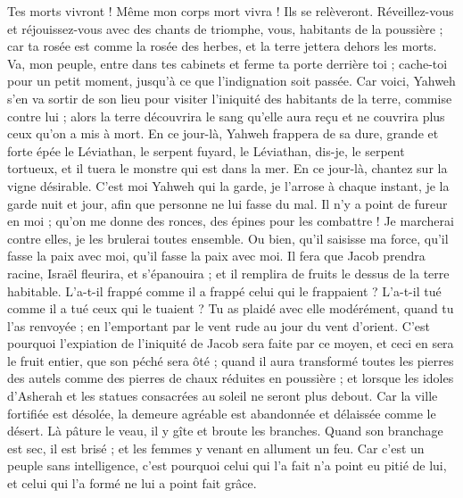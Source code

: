 \begin{multicols}{2}
Tes morts vivront ! Même mon corps mort vivra ! Ils se relèveront. Réveillez-vous et réjouissez-vous avec des chants de triomphe, vous, habitants de la poussière ; car ta rosée est comme la rosée des herbes, et la terre jettera dehors les morts.
Va, mon peuple, entre dans tes cabinets et ferme ta porte derrière toi ; cache-toi pour un petit moment, jusqu'à ce que l'indignation soit passée.
Car voici, Yahweh s'en va sortir de son lieu pour visiter l'iniquité des habitants de la terre, commise contre lui ; alors la terre découvrira le sang qu'elle aura reçu et ne couvrira plus ceux qu'on a mis à mort.
\VerseOne{}En ce jour-là, Yahweh frappera de sa dure, grande et forte épée le Léviathan, le serpent fuyard, le Léviathan, dis-je, le serpent tortueux, et il tuera le monstre qui est dans la mer.
En ce jour-là, chantez sur la vigne désirable.
C'est moi Yahweh qui la garde, je l'arrose à chaque instant, je la garde nuit et jour, afin que personne ne lui fasse du mal.
Il n'y a point de fureur en moi ; qu'on me donne des ronces, des épines pour les combattre ! Je marcherai contre elles, je les brulerai toutes ensemble.
Ou bien, qu'il saisisse ma force, qu'il fasse la paix avec moi, qu'il fasse la paix avec moi.
Il fera que Jacob prendra racine, Israël fleurira, et s'épanouira ; et il remplira de fruits le dessus de la terre habitable.
L'a-t-il frappé comme il a frappé celui qui le frappaient ? L'a-t-il tué comme il a tué ceux qui le tuaient ?
Tu as plaidé avec elle modérément, quand tu l'as renvoyée ; en l'emportant par le vent rude au jour du vent d'orient.
C'est pourquoi l'expiation de l'iniquité de Jacob sera faite par ce moyen, et ceci en sera le fruit entier, que son péché sera ôté ; quand il aura transformé toutes les pierres des autels comme des pierres de chaux réduites en poussière ; et lorsque les idoles d'Asherah et les statues consacrées au soleil ne seront plus debout.
Car la ville fortifiée est désolée, la demeure agréable est abandonnée et délaissée comme le désert. Là pâture le veau, il y gîte et broute les branches.
Quand son branchage est sec, il est brisé ; et les femmes y venant en allument un feu. Car c'est un peuple sans intelligence, c'est pourquoi celui qui l'a fait n'a point eu pitié de lui, et celui qui l'a formé ne lui a point fait grâce.

\end{multicols}
